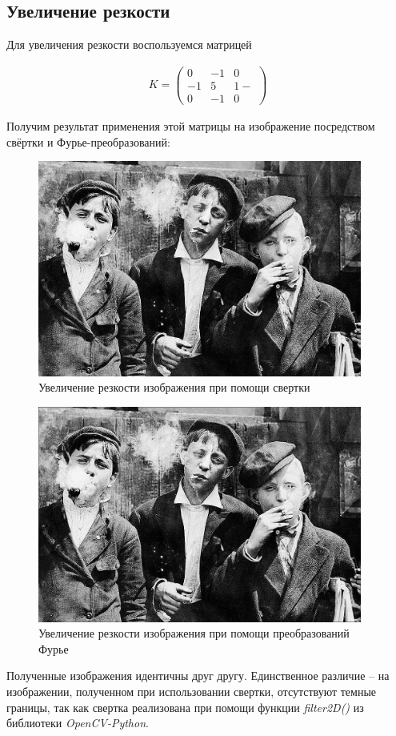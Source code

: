\subsection{Увеличение резкости}

Для увеличения резкости воспользуемся матрицей

\begin{gather}
    K = \begin{pmatrix}
        0 & -1 & 0\\
        -1 & 5 & 1-\\
        0 & -1 & 0
    \end{pmatrix}  
\end{gather}

Получим результат применения этой матрицы на изображение посредством свёртки и Фурье-преобразований:

\begin{figure}[ht!]
    \centering
    \includegraphics[width=0.95\textwidth]{images/result/task_3/Sharpened.png}
    \caption{Увеличение резкости изображения при помощи свертки}
    \label{fig:sh_c_5}
\end{figure}

\begin{figure}[ht!]
    \centering
    \includegraphics[width=0.95\textwidth]{images/result/task_3/Sharpened_fourier.png}
    \caption{Увеличение резкости изображения при помощи преобразований Фурье}
    \label{fig:sh_f_5}
\end{figure}
\clearpage
Полученные изображения идентичны друг другу. Единственное различие -- на изображении, полученном при использовании свертки, отсутствуют темные границы, так как свертка реализована при помощи функции \textit{filter2D()} из библиотеки \textit{OpenCV-Python}.
